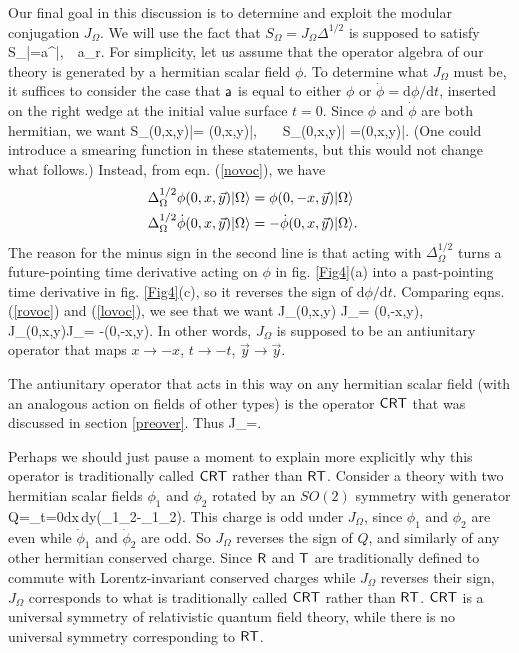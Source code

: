 \documentclass[12pt]{article}
\def\a{{\sf a}}
\def\CRT{{\sf{CRT}}}
\def\ra{\rangle}
\numberwithin{equation}{section}
\def\d{\mathrm d}
\def\A{{\mathcal A}}
\begin{document}
 Our final goal in this discussion is to determine and exploit
  the  modular conjugation $J_\Omega$.   We will use the fact that $S_\Omega=J_\Omega
 \Delta^{1/2}$ is supposed to satisfy
 \be\label{rovoc} S_\Omega \a|\Omega\ra =\a^\dagger|\Omega\ra,~~\a\in\A_r.\ee
 For simplicity, let us assume that the operator algebra of our theory is generated by a hermitian scalar field $\phi$.   To determine
 what $J_\Omega$ must be, it suffices to consider the case that $\a$ is equal to either $\phi$ or $\dot\phi=\d \phi/\d t$, inserted
 on the right wedge at the initial value surface $t=0$.   Since $\phi$ and $\dot\phi$ are both hermitian, we want
 \be\label{provoc}S_\Omega\phi(0,x,\vec y)|\Omega\ra = \phi(0,x,\vec y)|\Omega\ra, ~~~S_\Omega \dot\phi(0,x,\vec y)|\Omega\ra
 =\dot\phi(0,x,\vec y)|\Omega\ra. \ee    (One could introduce a smearing function in these statements, but this would not change
 what follows.)
 Instead, from eqn. (\ref{novoc}), we have
 \begin{align}\label{lovoc} \Delta_\Omega^{1/2} \phi(0,x,\vec y)|\Omega\ra&=\phi(0,-x,\vec y)|\Omega\ra\cr \Delta_\Omega^{1/2} 
 \dot\phi(0,x,\vec y) |\Omega\ra&=-\dot\phi (0,x,\vec y)|\Omega\ra.\end{align}
 The reason for the minus sign in the second line is that acting with $\Delta_\Omega^{1/2}$ turns a future-pointing time derivative acting
 on $\phi$ in fig. \ref{Fig4}(a) into a past-pointing time derivative in fig. \ref{Fig4}(c), so it reverses the sign of $\d\phi/\d t$.
 Comparing eqns. (\ref{rovoc}) and (\ref{lovoc}), we see that we want
 \be\label{inco} J_\Omega \phi(0,x,\vec y) J_\Omega = \phi(0,-x,\vec y),~~~ J_\Omega\dot\phi(0,x,\vec y)J_\Omega = -\dot\phi(0,-x,\vec y). \ee
 In other words, $J_\Omega$ is supposed to be an antiunitary operator that maps $ x\to -x$, $t\to -t$, $\vec y \to \vec y$.
 
 The antiunitary operator that acts in this way on any hermitian scalar field (with an analogous action on fields of other types)
 is the operator $\CRT$ that was discussed in section \ref{preover}.  Thus
 \be\label{purinco}J_\Omega=\CRT.\ee
 
 Perhaps we should just pause a moment to explain more explicitly why this operator is traditionally called $\CRT$ rather than $\sf{RT}$.
 Consider a theory with two hermitian scalar fields $\phi_1$ and $\phi_2$ rotated by an $SO(2)$ symmetry with generator
 \be\label{zurinco} Q=\int_{t=0}\d x\,\d\vec y\left(\phi_1\dot \phi_2-\dot\phi_1\phi_2\right). \ee
 This charge is odd under $J_\Omega$, since $\phi_1$ and $\phi_2$ are even while $\dot\phi_1$ and $\dot\phi_2$ are odd.
 So $J_\Omega$ reverses the sign of $Q$, and similarly of any other hermitian conserved charge.  Since $\sf R$ and $\sf T$ are
 traditionally defined to commute with Lorentz-invariant conserved charges while $J_\Omega$ reverses their sign, $J_\Omega$
 corresponds to what is traditionally called $\CRT$ rather than $\sf{RT}$.    $\CRT$ is a universal symmetry of
 relativistic quantum field theory, while there is no universal symmetry corresponding to $\sf{RT}$.
 
\end{document}

